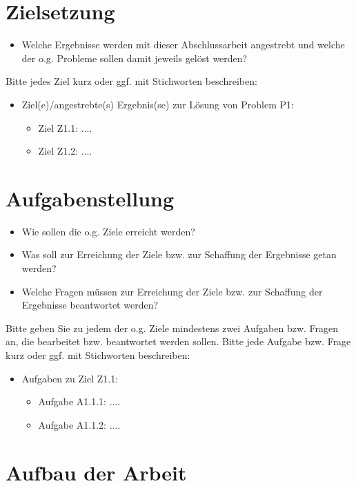 \documentclass[headsepline,titlepage,twoside,12pt]{report}
\begin{document}
\section{Zielsetzung}

\begin{itemize}
\item Welche Ergebnisse werden mit dieser Abschlussarbeit angestrebt und welche der o.g. Probleme sollen damit jeweils gelöst werden?
\end{itemize}
Bitte jedes Ziel kurz oder ggf. mit Stichworten beschreiben:
\begin{itemize}
\item Ziel(e)/angestrebte(s) Ergebnis(se) zur Lösung von Problem P1:
	\begin{itemize}
	\item Ziel Z1.1: ....
	\item Ziel Z1.2: ....
	\end{itemize}
\end{itemize}

\section{Aufgabenstellung}

\begin{itemize}
\item Wie sollen die o.g. Ziele erreicht werden?
\item Was soll zur Erreichung der Ziele bzw. zur Schaffung der Ergebnisse getan werden?
\item Welche Fragen müssen zur Erreichung der Ziele bzw. zur Schaffung der Ergebnisse beantwortet  werden?
\end{itemize}


Bitte geben Sie zu jedem der o.g. Ziele mindestens zwei Aufgaben bzw. Fragen an, die bearbeitet bzw. beantwortet werden sollen. Bitte jede Aufgabe bzw. Frage kurz oder ggf. mit Stichworten beschreiben:

\begin{itemize}
\item Aufgaben zu Ziel Z1.1:
	\begin{itemize}
	\item Aufgabe A1.1.1: ....
	\item Aufgabe A1.1.2: ....
	\end{itemize}
\end{itemize}

\section{Aufbau der Arbeit}
\end{document}
